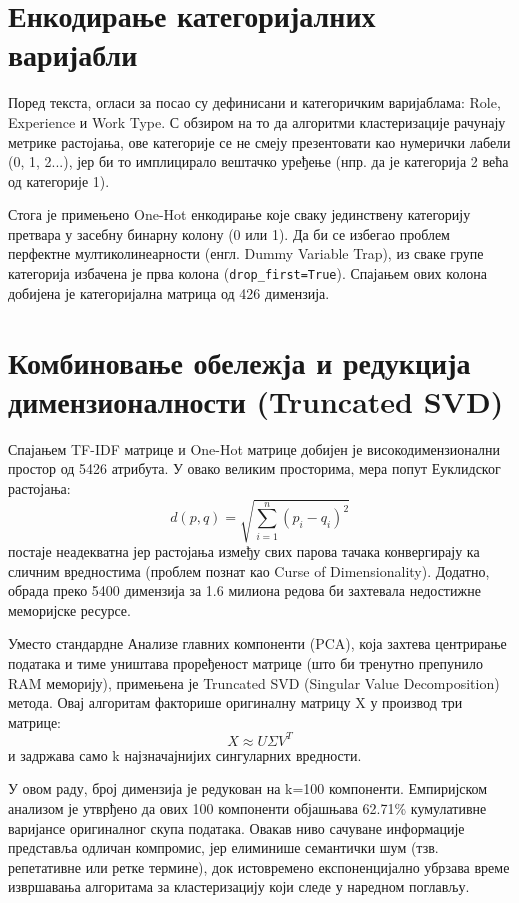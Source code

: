 \documentclass[a4paper,12pt]{report}
\begin{document}
	\section{Енкодирање категоријалних варијабли}
	Поред текста, огласи за посао су дефинисани и категоричким варијаблама: Role, Experience и Work Type. С обзиром на то да алгоритми кластеризације рачунају метрике растојања, ове категорије се не смеју презентовати као нумерички лабели (0, 1, 2...), јер би то имплицирало вештачко уређење (нпр. да је категорија 2 већа од категорије 1).
	
	Стога је примењено One-Hot енкодирање које сваку јединствену категорију претвара у засебну бинарну колону (0 или 1). Да би се избегао проблем перфектне мултиколинеарности (енгл. Dummy Variable Trap), из сваке групе категорија избачена је прва колона (\verb|drop_first=True|). Спајањем ових колона добијена је категоријална матрица од 426 димензија.

	\section{Комбиновање обележја и редукција димензионалности (Truncated SVD)}
	Спајањем TF-IDF матрице и One-Hot матрице добијен је високодимензионални простор од 5426 атрибута. У овако великим просторима, мера попут Еуклидског растојања:
	$$ d(p, q) = \sqrt{\sum_{i=1}^{n} (p_i - q_i)^2} $$
	постаје неадекватна јер растојања између свих парова тачака конвергирају ка сличним вредностима (проблем познат као Curse of Dimensionality). Додатно, обрада преко 5400 димензија за 1.6 милиона редова би захтевала недостижне меморијске ресурсе.
	
	Уместо стандардне Анализе главних компоненти (PCA), која захтева центрирање података и тиме уништава проређеност матрице (што би тренутно препунило RAM меморију), примењена је Truncated SVD (Singular Value Decomposition) метода. Овај алгоритам факторише оригиналну матрицу X у производ три матрице:
	$$ X \approx U\Sigma V^T $$ 
	и задржава само k најзначајнијих сингуларних вредности.
	
	У овом раду, број димензија је редукован на k=100 компоненти. Емпиријском анализом је утврђено да ових 100 компоненти објашњава 62.71\% кумулативне варијансе оригиналног скупа података. Овакав ниво сачуване информације представља одличан компромис, јер елиминише семантички шум (тзв. репетативне или ретке термине), док истовремено експоненцијално убрзава време извршавања алгоритама за кластеризацију који следе у наредном поглављу.
	
\end{document}
